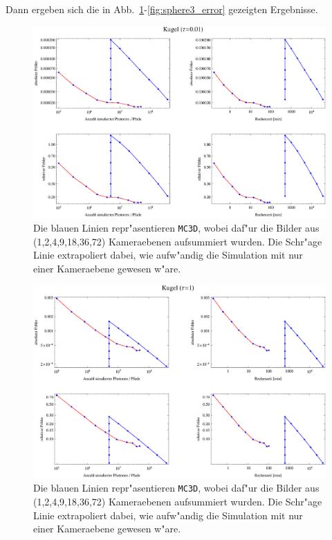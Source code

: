 	
	Dann ergeben sich die in Abb.~\ref{fig:sphere1_error}-\ref{fig:sphere3_error} gezeigten Ergebnisse.
	
		\begin{figure}
			\centering
			\includegraphics[angle=90,height=1.0\textheight]{sphere1errorplot.eps}
			\caption{Die blauen Linien repr"asentieren \texttt{MC3D}, wobei daf"ur die Bilder aus (1,2,4,9,18,36,72) Kameraebenen aufsummiert wurden. Die Schr"age Linie extrapoliert dabei, wie aufw"andig die Simulation mit nur einer Kameraebene gewesen w"are.}
			\label{fig:sphere1_error}
		\end{figure}
		\begin{figure}
			\centering
			\includegraphics[angle=90,height=1.0\textheight]{sphere2errorplot.eps}
			\caption{Die blauen Linien repr"asentieren \texttt{MC3D}, wobei daf"ur die Bilder aus (1,2,4,9,18,36,72) Kameraebenen aufsummiert wurden. Die Schr"age Linie extrapoliert dabei, wie aufw"andig die Simulation mit nur einer Kameraebene gewesen w"are.}
			\label{fig:sphere2_error}
		\end{figure}
